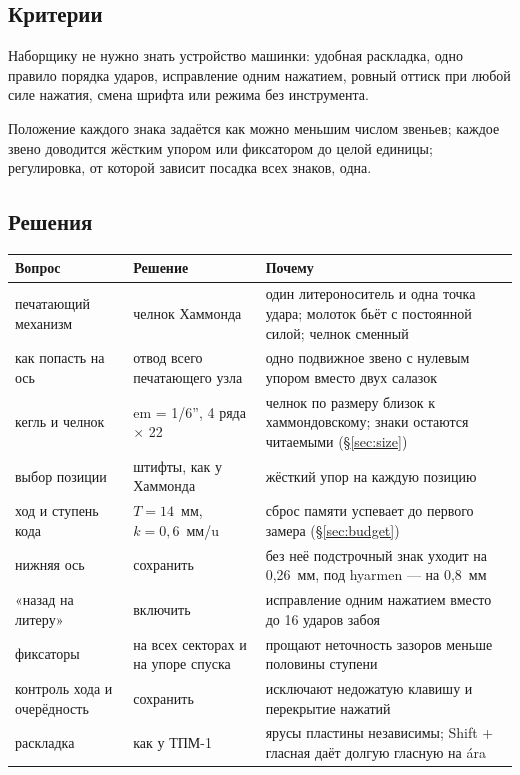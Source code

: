 \subsection{Критерии}

\begin{description}[style=nextline,leftmargin=0pt]
  \item[Простота в эксплуатации.] Наборщику не нужно знать устройство машинки: удобная раскладка, одно правило порядка ударов, исправление одним нажатием, ровный оттиск при любой силе нажатия, смена шрифта или режима без инструмента.
  \item[Точность механизма.] Положение каждого знака задаётся как можно меньшим числом звеньев; каждое звено доводится жёстким упором или фиксатором до целой единицы; регулировка, от которой зависит посадка всех знаков, одна.
\end{description}

\subsection{Решения}

\begin{center}\small
\begin{tabularx}{\linewidth}{@{}>{\raggedright}p{30mm}>{\raggedright}p{30mm}>{\raggedright\arraybackslash}X@{}}
\toprule
Вопрос & Решение & Почему \\
\midrule
печатающий механизм & челнок Хаммонда & один литероноситель и одна точка удара; молоток бьёт с постоянной силой; челнок сменный \\
как попасть на ось & отвод всего печатающего узла & одно подвижное звено с нулевым упором вместо двух салазок \\
кегль и челнок & em = 1/6'', 4 ряда $\times$ 22 & челнок по размеру близок к хаммондовскому; знаки остаются читаемыми (\S\ref{sec:size}) \\
выбор позиции & штифты, как у Хаммонда & жёсткий упор на каждую позицию \\
ход и ступень кода & $T = 14$~мм, $k = 0{,}6$~мм/u & сброс памяти успевает до первого замера (\S\ref{sec:budget}) \\
нижняя ось & сохранить & без неё подстрочный знак уходит на 0,26~мм, под hyarmen — на 0,8~мм \\
«назад на литеру» & включить & исправление одним нажатием вместо до 16 ударов забоя \\
фиксаторы & на всех секторах и на упоре спуска & прощают неточность зазоров меньше половины ступени \\
контроль хода и очерёдность & сохранить & исключают недожатую клавишу и перекрытие нажатий \\
раскладка & как у ТПМ-1 & ярусы пластины независимы; Shift + гласная даёт долгую гласную на ára \\
\bottomrule
\end{tabularx}
\end{center}

